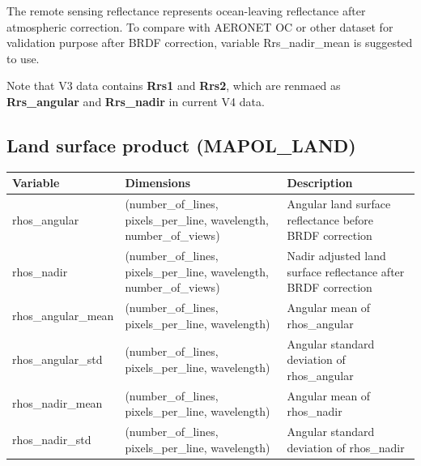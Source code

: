 \documentclass[
  11pt,
  letterpaper,
  DIV=11,
  numbers=noendperiod]{scrreprt}
\begin{document}
The remote sensing reflectance represents ocean-leaving reflectance
after atmospheric correction. To compare with AERONET OC or other
dataset for validation purpose after BRDF correction, variable
Rrs\_nadir\_mean is suggested to use.

Note that V3 data contains \textbf{Rrs1} and \textbf{Rrs2}, which are
renmaed as \textbf{Rrs\_angular} and \textbf{Rrs\_nadir} in current V4
data.

\subsection{Land surface product
(MAPOL\_LAND)}\label{land-surface-product-mapol_land}

\begin{longtable}[]{@{}
  >{\raggedright\arraybackslash}p{}
  >{\raggedright\arraybackslash}p{}
  >{\raggedright\arraybackslash}p{}@{}}
\toprule\noalign{}
\begin{minipage}[b]{\linewidth}\raggedright
Variable
\end{minipage} & \begin{minipage}[b]{\linewidth}\raggedright
Dimensions
\end{minipage} & \begin{minipage}[b]{\linewidth}\raggedright
Description
\end{minipage} \\
\midrule\noalign{}
\endhead
\bottomrule\noalign{}
\endlastfoot
rhos\_angular & (number\_of\_lines, pixels\_per\_line, wavelength,
number\_of\_views) & Angular land surface reflectance before BRDF
correction \\
rhos\_nadir & (number\_of\_lines, pixels\_per\_line, wavelength,
number\_of\_views) & Nadir adjusted land surface reflectance after BRDF
correction \\
rhos\_angular\_mean & (number\_of\_lines, pixels\_per\_line, wavelength)
& Angular mean of rhos\_angular \\
rhos\_angular\_std & (number\_of\_lines, pixels\_per\_line, wavelength)
& Angular standard deviation of rhos\_angular \\
rhos\_nadir\_mean & (number\_of\_lines, pixels\_per\_line, wavelength) &
Angular mean of rhos\_nadir \\
rhos\_nadir\_std & (number\_of\_lines, pixels\_per\_line, wavelength) &
Angular standard deviation of rhos\_nadir \\
\end{longtable}
\end{document}
